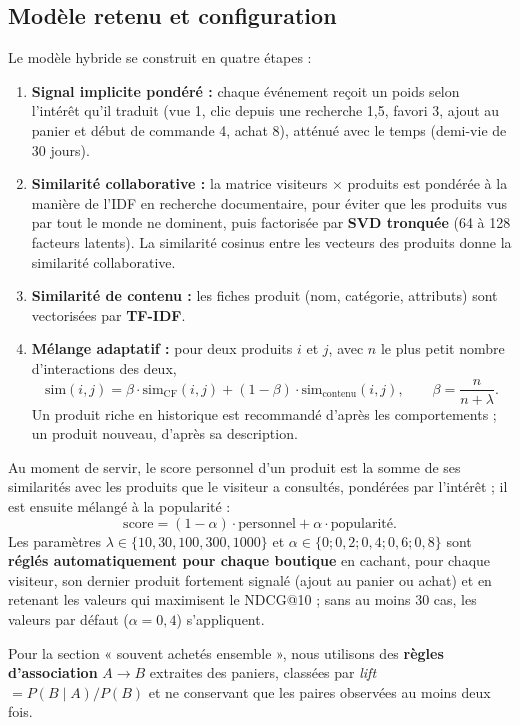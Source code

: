 \subsection{Modèle retenu et configuration}
Le modèle hybride se construit en quatre étapes :
\begin{enumerate}
  \item \textbf{Signal implicite pondéré :} chaque événement reçoit un poids selon l'intérêt qu'il traduit (vue 1, clic depuis une recherche 1,5, favori 3, ajout au panier et début de commande 4, achat 8), atténué avec le temps (demi-vie de 30 jours).
  \item \textbf{Similarité collaborative :} la matrice visiteurs × produits est pondérée à la manière de l'IDF en recherche documentaire, pour éviter que les produits vus par tout le monde ne dominent, puis factorisée par \textbf{SVD tronquée} (64 à 128 facteurs latents). La similarité cosinus entre les vecteurs des produits donne la similarité collaborative.
  \item \textbf{Similarité de contenu :} les fiches produit (nom, catégorie, attributs) sont vectorisées par \textbf{TF-IDF}.
  \item \textbf{Mélange adaptatif :} pour deux produits $i$ et $j$, avec $n$ le plus petit nombre d'interactions des deux,
  \[ \text{sim}(i,j) = \beta \cdot \text{sim}_{\text{CF}}(i,j) + (1-\beta)\cdot \text{sim}_{\text{contenu}}(i,j), \qquad \beta = \frac{n}{n+\lambda}. \]
  Un produit riche en historique est recommandé d'après les comportements ; un produit nouveau, d'après sa description.
\end{enumerate}
Au moment de servir, le score personnel d'un produit est la somme de ses similarités avec les produits que le visiteur a consultés, pondérées par l'intérêt ; il est ensuite mélangé à la popularité :
\[ \text{score} = (1-\alpha)\cdot \text{personnel} + \alpha \cdot \text{popularité}. \]
Les paramètres $\lambda \in \{10, 30, 100, 300, 1000\}$ et $\alpha \in \{0; 0{,}2; 0{,}4; 0{,}6; 0{,}8\}$ sont \textbf{réglés automatiquement pour chaque boutique} en cachant, pour chaque visiteur, son dernier produit fortement signalé (ajout au panier ou achat) et en retenant les valeurs qui maximisent le NDCG@10 ; sans au moins 30 cas, les valeurs par défaut ($\alpha = 0{,}4$) s'appliquent.

Pour la section « souvent achetés ensemble », nous utilisons des \textbf{règles d'association} $A \rightarrow B$ extraites des paniers, classées par \textit{lift} $= P(B \mid A) / P(B)$ et ne conservant que les paires observées au moins deux fois.

